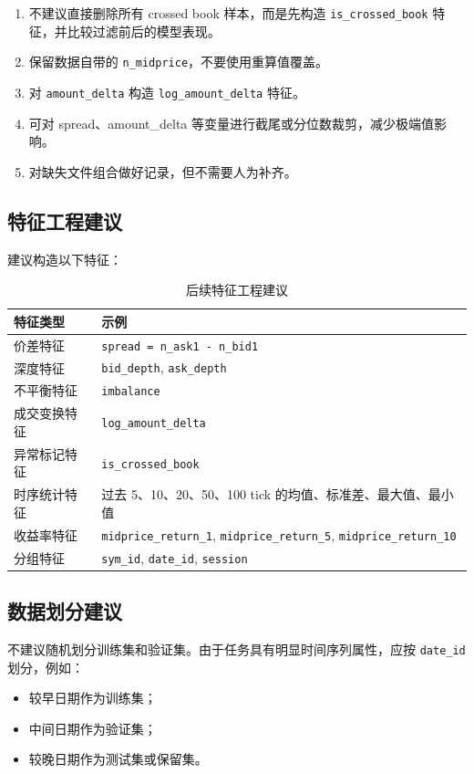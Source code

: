 \documentclass[UTF8,a4paper,12pt]{ctexart}
\begin{document}
\begin{enumerate}
    \item 不建议直接删除所有 crossed book 样本，而是先构造 \texttt{is\_crossed\_book} 特征，并比较过滤前后的模型表现。
    \item 保留数据自带的 \texttt{n\_midprice}，不要使用重算值覆盖。
    \item 对 \texttt{amount\_delta} 构造 \texttt{log\_amount\_delta} 特征。
    \item 可对 spread、amount\_delta 等变量进行截尾或分位数裁剪，减少极端值影响。
    \item 对缺失文件组合做好记录，但不需要人为补齐。
\end{enumerate}

\subsection{特征工程建议}

建议构造以下特征：

\begin{table}[H]
\centering
\caption{后续特征工程建议}
\begin{tabular}{ll}
\toprule
特征类型 & 示例 \\
\midrule
价差特征 & \texttt{spread = n\_ask1 - n\_bid1} \\
深度特征 & \texttt{bid\_depth}, \texttt{ask\_depth} \\
不平衡特征 & \texttt{imbalance} \\
成交变换特征 & \texttt{log\_amount\_delta} \\
异常标记特征 & \texttt{is\_crossed\_book} \\
时序统计特征 & 过去 5、10、20、50、100 tick 的均值、标准差、最大值、最小值 \\
收益率特征 & \texttt{midprice\_return\_1}, \texttt{midprice\_return\_5}, \texttt{midprice\_return\_10} \\
分组特征 & \texttt{sym\_id}, \texttt{date\_id}, \texttt{session} \\
\bottomrule
\end{tabular}
\end{table}

\subsection{数据划分建议}

不建议随机划分训练集和验证集。由于任务具有明显时间序列属性，应按 \texttt{date\_id} 划分，例如：

\begin{itemize}
    \item 较早日期作为训练集；
    \item 中间日期作为验证集；
    \item 较晚日期作为测试集或保留集。
\end{itemize}
\end{document}
